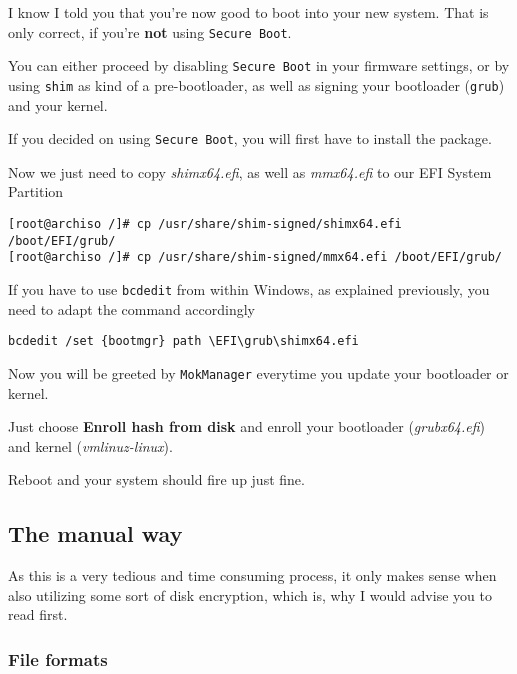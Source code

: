 \documentclass[10pt]{dustdoc}
\begin{document}
I know I told you that you’re now good to boot into your new system.
That is only correct, if you’re \textbf{not} using \texttt{Secure Boot}.

You can either proceed by disabling \texttt{Secure Boot} in your firmware settings, or by using \texttt{shim} as kind of a pre-bootloader, as well as signing your bootloader (\texttt{grub}) and your kernel.

If you decided on using \texttt{Secure Boot}, you will first have to install the package.

Now we just need to copy \textit{shimx64.efi}, as well as \textit{mmx64.efi} to our EFI System Partition

\begin{verbatim}
[root@archiso /]# cp /usr/share/shim-signed/shimx64.efi /boot/EFI/grub/
[root@archiso /]# cp /usr/share/shim-signed/mmx64.efi /boot/EFI/grub/
\end{verbatim}

\begin{NOTE}
    If you have to use \texttt{bcdedit} from within Windows, as explained previously, you need to adapt the command accordingly

    \begin{verbatim}
bcdedit /set {bootmgr} path \EFI\grub\shimx64.efi
    \end{verbatim}
\end{NOTE}

Now you will be greeted by \texttt{MokManager} everytime you update your bootloader or kernel.

Just choose \textbf{Enroll hash from disk} and enroll your bootloader (\textit{grubx64.efi}) and kernel (\textit{vmlinuz-linux}).

Reboot and your system should fire up just fine.

\subsection{The manual way}
\label{sec:the-manual-way}

\begin{WARNING}
    As this is a very tedious and time consuming process, it only makes sense when also utilizing some sort of disk encryption, which is, why I would advise you to read  first.
\end{WARNING}

\subsubsection{File formats}
\label{sec:file-formats}
\end{document}

